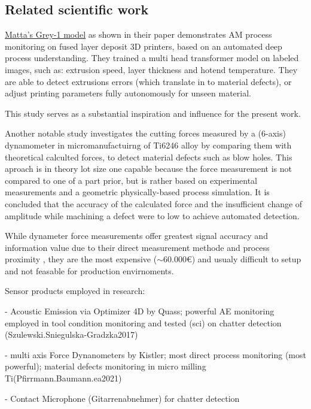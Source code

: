 \documentclass[5p,times,procedia]{elsarticle}
\newenvironment{note}{%
	\noindent
    \color{notecolor}%
}{%
    \par\medskip%
}
\begin{document}
\vspace*{-\baselineskip}
\subsection{Related scientific work}
\vspace*{-\baselineskip}


\href{https://www.matta.ai/greymatta}{Matta's Grey-1 model} as shown in their paper \cite{Brion.Pattinson2022} demonstrates AM process monitoring on fused layer deposit 3D printers, based on an automated deep process understanding. 
They trained a multi head transformer model on labeled images, such as: extrusion speed, layer thickness and hotend temperature. They are able to detect extrusions errors (which translate in to material defects), or adjust printing parameters fully autonomously for unseen material.\cite{Brion.Pattinson2022}

This study serves as a substantial inspiration and influence for the present work.


Another notable study \cite{Pfirrmann.Baumann.ea2021} investigates the cutting forces measured by a (6-axis) dynamometer in micromanufactuirng of Ti6246 alloy by comparing them with theoretical calculted forces, to detect material defects such as blow holes.
This aproach is in theory lot size one capable because the force measurement is not compared to one of a part prior, but is rather based on experimental measurements and a geometric physically-based process simulation. It is concluded that the accuracy of the calculated force and the insufficient change of amplitude while machining a defect were to low to achieve automated detection. \cite[p.169]{Pfirrmann.Baumann.ea2021} 

While dynameter force measurements offer greatest signal accuracy and information value due to their direct measurement methode and process proximity \cite[]{Korkmaz.Yasar.ea2020}, they are the most expensive ($\sim 60.000$\euro) and usualy difficult to setup and not feasable for production envirnoments.



\begin{note}
Sensor products employed in research:

- Acoustic Emission via Optimizer 4D by Quass; powerful AE monitoring employed in tool condition monitoring and tested (sci) on chatter detection (Szulewski.Sniegulska-Gradzka2017)

- multi axis Force Dynanometers by Kistler; most direct process monitoring (most powerful); material defects monitoring in micro milling Ti(Pfirrmann.Baumann.ea2021)

- Contact Microphone (Gitarrenabnehmer) for chatter detection
\end{note}
\end{document}
